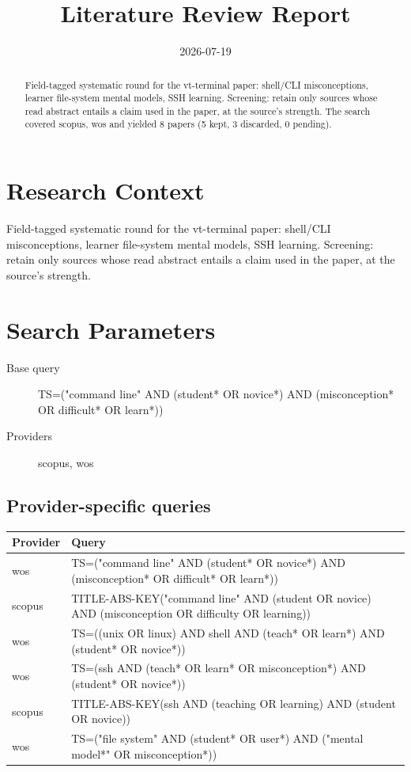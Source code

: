 \documentclass{article}
\title{Literature Review Report}
\date{2026-07-19}
\begin{document}
\maketitle

\begin{abstract}
Field-tagged systematic round for the vt-terminal paper: shell/CLI misconceptions, learner file-system mental models, SSH learning. Screening: retain only sources whose read abstract entails a claim used in the paper, at the source's strength. The search covered scopus, wos and yielded 8 papers (5 kept, 3 discarded, 0 pending).
\end{abstract}
\clearpage
\clearpage
\tableofcontents
\clearpage

\section{Research Context}
Field-tagged systematic round for the vt-terminal paper: shell/CLI
misconceptions, learner file-system mental models, SSH learning.
Screening: retain only sources whose read abstract entails a claim used
in the paper, at the source's strength.

\section{Search Parameters}

\begin{description}
\item[Base query] TS=("command line" AND (student* OR novice*) AND (misconception* OR difficult* OR learn*))
\item[Providers] scopus, wos
\end{description}

\subsection{Provider-specific queries}
\begin{longtable}{lp{10cm}}
\toprule
Provider & Query \\
\midrule
wos & TS=("command line" AND (student* OR novice*) AND (misconception* OR difficult* OR learn*)) \\
scopus & TITLE-ABS-KEY("command line" AND (student OR novice) AND (misconception OR difficulty OR learning)) \\
wos & TS=((unix OR linux) AND shell AND (teach* OR learn*) AND (student* OR novice*)) \\
wos & TS=(ssh AND (teach* OR learn* OR misconception*) AND (student* OR novice*)) \\
scopus & TITLE-ABS-KEY(ssh AND (teaching OR learning) AND (student OR novice)) \\
wos & TS=("file system" AND (student* OR user*) AND ("mental model*" OR misconception*)) \\
\bottomrule
\end{longtable}
\end{document}
